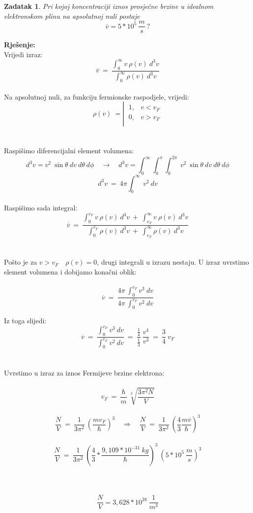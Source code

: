 \documentclass[a4paper,12pt]{article}
\newtheorem{ZDK}{Zadatak}[section]
\begin{document}
\newpage
\begin{ZDK}
	Pri kojoj koncentraciji iznos prosje\v{c}ne brzine u idealnom elektronskom plinu na apsolutnoj nuli postaje 
	$$ \overline{v}=5*10^5\ \frac{m}{s}\ ? $$
\end{ZDK}
\textbf{Rje\v{s}enje:} \\
\newline
Vrijedi izraz:
\\
$$ \overline{v}\ =\ \frac{\int_{0}^{\infty} v\ \rho(v)\ d^3v}{\int_{0}^{\infty} \rho(v)\ d^3v} $$
\\
Na apsolutnoj nuli, za funkciju fermionske raspodjele, vrijedi:
\begin{equation*}
	\rho(v)\ =\left|\  
	\begin{matrix}
		1, & v<v_F \\
		0, & v>v_F \\
	\end{matrix}
\end{equation*}
\\
\\
Raspi\v{s}imo diferencijalni element volumena:
$$ d^3v=v^2\ \sin{\theta}\ dv\ d\theta\ d\phi \quad \rightarrow \quad d^3v=\int_{0}^{\infty} \int_{0}^{\pi} \int_{0}^{2\pi}\ v^2\ \sin{\theta}\ dv\ d\theta\ d\phi $$
$$ d^3v\ =\ 4\pi \int_{0}^{\infty}\ v^2\ dv $$
\\
Raspi\v{s}imo sada integral:
\\
$$ \overline{v}\ =\ \frac{\int_{0}^{v_F} v\ \rho(v)\ d^3v\ +\ \int_{v_F}^{\infty} v\ \rho(v)\ d^3v}{\int_{0}^{v_F} \rho(v)\ d^3v\ +\ \int_{v_F}^{\infty} \rho(v)\ d^3v} $$
\\
\\
Po\v{s}to je za $v>v_F \quad \rho(v)=0$, drugi integrali u izrazu nestaju. U izraz uvrstimo element volumena i dobijamo kona\v{c}ni oblik:
\\
\\
$$ \overline{v}\ =\ \frac{4\pi\ \int_{0}^{v_F} v^3\ dv}{4\pi\ \int_{0}^{v_F} v^2\ dv} $$

\newpage
Iz toga slijedi:
\\
$$ \overline{v}\ =\ \frac{\int_{0}^{v_F} v^3\ dv}{\int_{0}^{v_F} v^2\ dv}\ =\ \frac{\frac{1}{4}}{\frac{1}{3}}\ \frac{v^4}{v^3}\ =\ \frac{3}{4}\ v_F $$
\\
\\
Uvrstimo u izraz za iznos Fermijeve brzine elektrona:
\\
\\
$$ v_F\ =\ \frac{\hbar}{m}\ \sqrt[3]{\frac{3 \pi^2 N}{V}} $$
\\
$$ \frac{N}{V}\ =\ \frac{1}{3 \pi^2}\ \left( \frac{mv_F}{\hbar} \right)^3 \quad \Rightarrow \quad \frac{N}{V}\ 
=\ \frac{1}{3 \pi^2}\ \left(\frac{4}{3} \frac{m\overline{v}}{\hbar} \right)^3 $$
\\
$$ \frac{N}{V}\ =\ \frac{1}{3 \pi^2}\ \left(\frac{4}{3}*\frac{9,109*10^{-31}\ kg}{\hbar} \right)^3\ \left( 5*10^5\ \frac{m}{s} \right)^3 $$
\\
\\
\\
$$ \frac{N}{V}=3,628*10^{28}\ \frac{1}{m^3} $$
\end{document}
